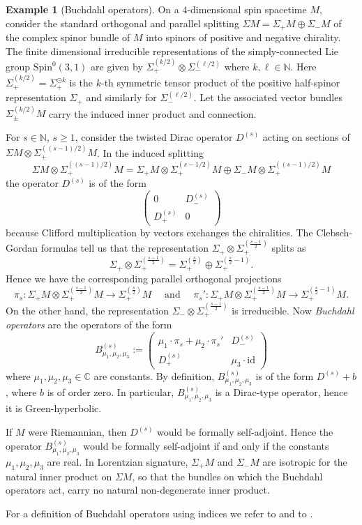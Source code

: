\documentclass[a4paper,11pt]{amsart}
\theoremstyle{definition}
\newtheorem{ex}[thm]{Example}
\begin{document}
\begin{ex}[Buchdahl operators]\label{ex:Buchdahl}
On a $4$-dimensional spin spacetime $M$, consider the standard orthogonal and parallel splitting $\Sigma M=\Sigma_+M\oplus\Sigma_-M$ of the complex spinor bundle of $M$ into spinors of positive and negative chirality.
The finite dimensional irreducible representations of the simply-connected Lie group $\mathrm{Spin}^0(3,1)$ are given by $\Sigma_+^{({k}/{2})} \otimes \Sigma_-^{({\ell}/{2})}$ where $k,\ell\in{\mathbb{N}}$.
Here $\Sigma_+^{({k}/{2})}=\Sigma_+^{\odot k}$ is the $k$-th symmetric tensor product of the positive half-spinor representation $\Sigma_+$ and similarly for $\Sigma_-^{({\ell}/{2})}$.
Let the associated vector bundles $\Sigma_\pm^{({k}/{2})} M$ carry the induced inner product and connection.

For $s\in\mathbb{N}$, $s\geq1$, consider the twisted Dirac operator $D^{(s)}$ acting on sections of $\Sigma M\otimes\Sigma_+^{({(s-1)}/{2})}M$.
In the induced splitting 
$$
\Sigma M\otimes\Sigma_+^{({(s-1)}/{2})}M
=
\Sigma_+M\otimes\Sigma_+^{({s-1}/{2})}M\oplus\Sigma_-M\otimes\Sigma_+^{({(s-1)}/{2})}M
$$ 
the operator $D^{(s)}$ is of the form 
$$
\left(\begin{array}{cc}0&D_-^{(s)}\\ D_+^{(s)}&0\end{array}\right)
$$
because Clifford multiplication by vectors exchanges the chiralities.
The Clebsch-Gordan formulas \cite[Prop. II.5.5]{BrtD} tell us that the representation $\Sigma_+\otimes\Sigma_+^{(\frac{s-1}{2})}$ splits as 
$$
\Sigma_+\otimes\Sigma_+^{(\frac{s-1}{2})}
=
\Sigma_+^{(\frac{s}{2})}\oplus\Sigma_+^{(\frac{s}{2}-1)}.
$$
Hence we have the corresponding parallel orthogonal projections 
$$
\pi_s :\Sigma_+M\otimes\Sigma_+^{(\frac{s-1}{2})}M \to \Sigma_+^{(\frac{s}{2})}M
\quad\mbox{ and }\quad
\pi_s' :\Sigma_+M\otimes\Sigma_+^{(\frac{s-1}{2})}M \to \Sigma_+^{(\frac{s}{2}-1)}M .
$$
On the other hand, the representation $\Sigma_-\otimes\Sigma_+^{(\frac{s-1}{2})}$ is irreducible.
Now \emph{Buchdahl operators} are the operators of the form 
$$
B_{\mu_1,\mu_2,\mu_3}^{(s)}
:=
\left(\begin{array}{cc}\mu_1\cdot\pi_s + \mu_2\cdot\pi_s'&D_-^{(s)}\\ D_+^{(s)}&\mu_3\cdot{\mathrm{id}}\end{array}\right)
$$
where $\mu_1,\mu_2,\mu_3\in\mathbb{C}$ are constants.
By definition, $B_{\mu_1,\mu_2,\mu_3}^{(s)}$ is of the form $D^{(s)}+b$, where $b$ is of order zero.
In particular, $B_{\mu_1,\mu_2,\mu_3}^{(s)}$ is a Dirac-type operator, hence it is Green-hyperbolic.

If $M$ were Riemannian, then $D^{(s)}$ would be formally self-adjoint. Hence the operator $B_{\mu_1,\mu_2,\mu_3}^{(s)}$ would be formally self-adjoint if and only if the constants $\mu_1,\mu_2,\mu_3$ are real.
In Lorentzian signature, $\Sigma_+M$ and $\Sigma_-M$ are isotropic for the natural inner product on $\Sigma M$, so that the bundles on which the Buchdahl operators act, carry no natural non-degenerate inner product.

For a definition of Buchdahl operators using indices we refer to \cite{Buchdahl2,Buchdahl3,Wue} and to \cite[Def.~8.1.4, p.~104]{MueDipl}.
\end{ex} 
\end{document}
